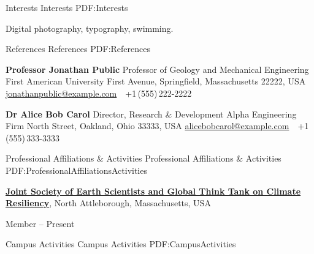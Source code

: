 \documentclass[letterpaper,MMMyyyy,nonstopmode]{simpleresumecv}
\begin{document}
\begin{Body}
{\iffalse



\Section
{Interests}
{Interests}
{PDF:Interests}

\Entry
Digital photography,
typography,
swimming.


\Section
{References}
{References}
{PDF:References}

\BulletItem
\textbf{Professor Jonathan Public}
\newline
Professor of Geology and Mechanical Engineering
\newline
First American University
 First Avenue, Springfield, Massachusetts 22222, USA
\newline
\href{mailto:jonathanpublic@example.com}
{jonathanpublic@example.com}
\,\SubBulletSymbol\,
+1\,(555)\,222-2222

\BigGap
\BulletItem
\textbf{Dr Alice Bob Carol}
\newline
Director, Research \& Development
\newline
Alpha Engineering Firm
 North Street, Oakland, Ohio 33333, USA
\newline
\href{mailto:alicebobcarol@example.com}
{alicebobcarol@example.com}
\,\SubBulletSymbol\,
+1\,(555)\,333-3333





\Section
{Professional Affiliations\newline
\& Activities}
{Professional Affiliations \& Activities}
{PDF:ProfessionalAffiliationsActivities}

\Entry
\href{http://www.example.com/my-society}
{\textbf{Joint Society of Earth Scientists and Global Think Tank on Climate Resiliency}},
\newline
North Attleborough, Massachusetts, USA

\Gap
\BulletItem
Member
\hfill
{} --
Present

\newpage


\Section
{Campus Activities}
{Campus Activities}
{PDF:CampusActivities}

}
\end{Body}
\end{document}
